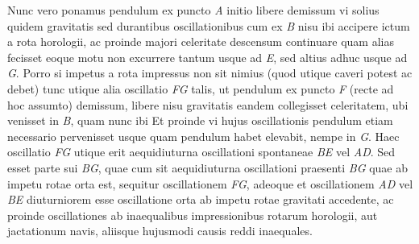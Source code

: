 Nunc vero ponamus pendulum ex puncto \textit{A} initio libere demissum vi solius quidem gravitatis
sed durantibus oscillationibus cum ex \textit{B} nisu
%
{}
ibi accipere ictum a rota horologii,
ac proinde majori celeritate descensum continuare quam alias fecisset
eoque motu non excurrere tantum usque ad \textit{E}, sed altius adhuc usque ad \textit{G}.
\pend 
\count{}
\pstart  Porro si impetus a rota impressus non sit nimius (quod utique caveri potest ac debet) tunc utique
alia oscillatio \textit{FG} talis, ut pendulum ex puncto \textit{F} (recte ad hoc assumto) demissum,
libere nisu gravitatis eandem collegisset celeritatem, ubi venisset in \textit{B}, quam nunc ibi
Et proinde vi hujus oscillationis pendulum etiam necessario pervenisset usque
quam pendulum habet
%
{}
elevabit, nempe in \textit{G}.
Haec oscillatio \textit{FG} utique erit aequidiuturna oscillationi spontaneae \textit{BE} vel \textit{AD}.
Sed 
esset parte sui \textit{BG},
quae cum sit aequidiuturna oscillationi praesenti \textit{BG} quae ab impetu rotae
orta est, sequitur oscillationem \textit{FG},
adeoque et oscillationem \textit{AD} vel \textit{BE} diuturniorem esse oscillatione
orta ab impetu rotae gravitati accedente,
ac proinde oscillationes ab inaequalibus impressionibus rotarum horologii,
aut jactationum navis, aliisque hujusmodi causis reddi inaequales.

